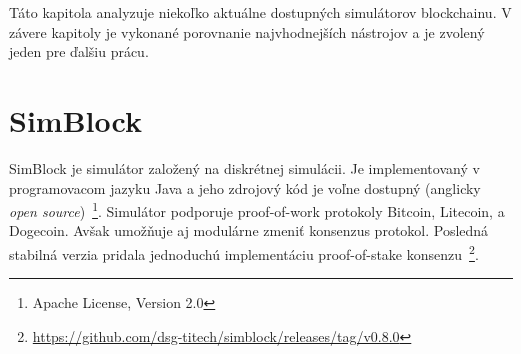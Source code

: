 Táto kapitola analyzuje niekoľko aktuálne dostupných simulátorov blockchainu. V závere kapitoly je vykonané porovnanie najvhodnejších nástrojov a je zvolený jeden pre ďalšiu prácu.




\section{SimBlock}

SimBlock je simulátor založený na diskrétnej simulácii. Je implementovaný v programovacom jazyku Java a jeho zdrojový kód je voľne dostupný (anglicky \textit{open source})~\footnote{Apache License, Version 2.0}. Simulátor podporuje proof-of-work protokoly Bitcoin, Litecoin, a Dogecoin. Avšak umožňuje aj modulárne zmeniť konsenzus protokol. Posledná stabilná verzia pridala jednoduchú implementáciu proof-of-stake konsenzu~\footnote{\url{https://github.com/dsg-titech/simblock/releases/tag/v0.8.0}}.

